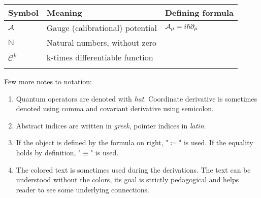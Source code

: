 

\begin{tabular} {@{}C{1.9cm}@{}p{8cm}@{}C{3.77cm}}
	\toprule
	\textbf{Symbol}& \textbf{Meaning}& \textbf{Defining formula}\\\bottomrule
	$\mathcal{A}$ & Gauge (calibrational) potential & $\mathcal{A}_\mu=i\hbar \partial_\mu$ \\
	$\mathbb{N}$ & Natural numbers, without zero \\
	$\mathcal{C}^k$ & k-times differentiable function \\
	
\bottomrule
{}
\end{tabular}

Few more notes to notation:
\begin{enumerate}
	\item Quantum operators are denoted with \emph{hat}. Coordinate derivative is sometimes denoted using comma and covariant derivative using semicolon. 
	\item Abstract indices are written in \emph{greek}, pointer indices in \emph{latin}. 
	\item If the object is defined by the formula on right, "$\coloneqq$" is used. If the equality holds by definition, "$\equiv$" is used. 
	\item The colored text is sometimes used during the derivations. The text can be understood without the colors, its goal is strictly pedagogical and helps reader to see some underlying connections.
\end{enumerate}